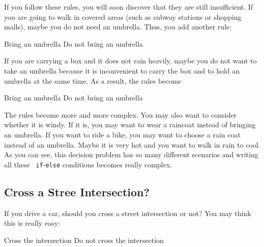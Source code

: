 If you follow these rules, you will soon discover that they are still
insufficient.  If you are going to walk in covered areas (such as
subway stations or shopping malls), maybe you do not need an umbrella.
Thus, you add another rule:

\begin{algorithm}
    \begin{algorithmic}[1]
      \State Bring an umbrella
      \Else
      \State Do not bring an umbrella
      \EndIf
    \end{algorithmic}
\end{algorithm}


If you are carrying a box and it does not rain heavily, maybe you
do not want to take an umbrella because it is inconvenient to carry
the box and to hold an umbrella at the same time. As a result,
the rules become

\begin{algorithm}
    \begin{algorithmic}[1]
      \State Bring an umbrella
      \Else
      \State Do not bring an umbrella
      \EndIf
    \end{algorithmic}
\end{algorithm}

The rules become more and more complex.  You may also want to consider
whether it is windy. If it is, you may want to wear a raincoat instead
of bringing an umbrella. If you want to ride a bike, you may want to
choose a rain coat instead of an umbrella.  Maybe it is very hot and
you want to walk in rain to cool.  As you can see, this decision
problem has so many different scenarios and writing all these {\tt
  if}-{\tt else} conditions becomes really complex.

\subsection{Cross a Stree Intersection?}

If you drive a car, should you cross a street intersection or not?
You may think this is really easy:

\begin{algorithm}[H]
    \begin{algorithmic}[1]
      \State Cross the intersection
      \Else
      \State Do not cross the intersection
      \EndIf
    \end{algorithmic}
\end{algorithm}

